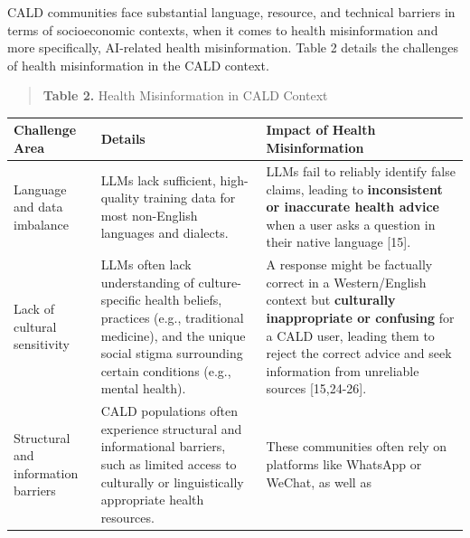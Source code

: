 \documentclass[]{article}
\newcounter{none} %
\begin{document}
CALD communities face substantial language, resource, and technical
barriers in terms of socioeconomic contexts, when it comes to health
misinformation and more specifically, AI-related health
misinformation. Table 2 details the challenges of health
misinformation in the CALD context.

\begin{quote}
\textbf{Table 2.} Health Misinformation in CALD Context
\end{quote}

{\def\LTcaptype{none} %
\begin{longtable}[]{@{}
  >{\raggedright\arraybackslash}p{}
  >{\raggedright\arraybackslash}p{}
  >{\raggedright\arraybackslash}p{}@{}}
\toprule\noalign{}
\begin{minipage}[b]{\linewidth}\raggedright
\textbf{Challenge Area}
\end{minipage} & \begin{minipage}[b]{\linewidth}\raggedright
\textbf{Details}
\end{minipage} & \begin{minipage}[b]{\linewidth}\raggedright
\textbf{Impact of Health Misinformation}
\end{minipage} \\
\midrule\noalign{}
\endhead
\bottomrule\noalign{}
\endlastfoot
Language and data imbalance & LLMs lack sufficient, high-quality
training data for most non-English languages and dialects. & LLMs fail
to reliably identify false claims, leading to \textbf{inconsistent or
inaccurate health advice} when a user asks a question in their native
language {[}15{]}. \\
Lack of cultural sensitivity & LLMs often lack understanding of
culture-specific health beliefs, practices (e.g., traditional medicine),
and the unique social stigma surrounding certain conditions (e.g.,
mental health). & A response might be factually correct in a
Western/English context but \textbf{culturally inappropriate or
confusing} for a CALD user, leading them to reject the correct advice
and seek information from unreliable sources {[}15,24-26{]}. \\
Structural and information barriers & CALD populations often experience
structural and informational barriers, such as limited access to
culturally or linguistically appropriate health resources. & These
communities often rely on platforms like WhatsApp or WeChat, as well as

\end{longtable}}
\end{document}

